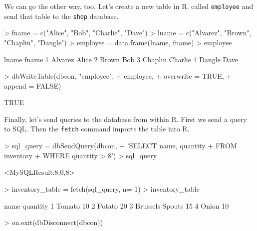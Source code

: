 \documentclass[11pt,oneside]{article}
\begin{document}
\begin{enumerate}
\vspace{25 pt}
We can go the other way, too. Let's create a new table in R, called \texttt{employee} and send that table to the \texttt{shop} database.

\begin{Schunk}
\begin{Sinput}
> fname = c("Alice", "Bob", "Charlie", "Dave")
> lname = c("Alvarez", "Brown", "Chaplin", "Dangle")
> employee = data.frame(lname, fname)
> employee
\end{Sinput}
\begin{Soutput}
    lname   fname
1 Alvarez   Alice
2   Brown     Bob
3 Chaplin Charlie
4  Dangle    Dave
\end{Soutput}
\begin{Sinput}
> dbWriteTable(dbcon, "employee", 
+              employee, 
+              overwrite = TRUE, 
+              append = FALSE)
\end{Sinput}
\begin{Soutput}
[1] TRUE
\end{Soutput}
\end{Schunk}


\vspace{25 pt}
Finally, let's send queries to the database from within R. First we send a query to SQL. Then the \texttt{fetch} command imports the table into R. 

\begin{Schunk}
\begin{Sinput}
> sql_query = dbSendQuery(dbcon, 
+                         'SELECT name, quantity 
+                         FROM inventory 
+                         WHERE quantity > 8')
> sql_query
\end{Sinput}
\begin{Soutput}
<MySQLResult:8,0,8>
\end{Soutput}
\begin{Sinput}
> inventory_table = fetch(sql_query, n=-1)
> inventory_table
\end{Sinput}
\begin{Soutput}
             name quantity
1          Tomato       10
2          Potato       20
3 Brussels Spouts       15
4           Onion       10
\end{Soutput}
\begin{Sinput}
> on.exit(dbDisconnect(dbcon))
\end{Sinput}
\end{Schunk}
\end{enumerate}
\end{document}
